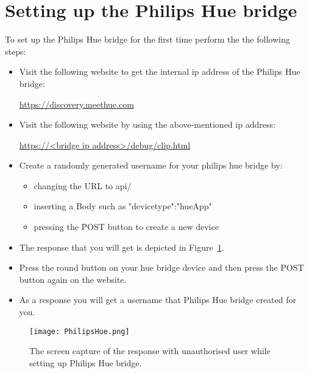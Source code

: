 \section{Setting up the Philips Hue bridge}
\label{sec:setting-up-the-philips-hue-bridge.}
To set up the Philips Hue bridge for the first time perform the the following steps:
\begin{itemize}
    \item Visit the following website to get the internal ip address of the Philips Hue bridge:

    \url{https://discovery.meethue.com}
    \item Visit the following website by using the above-mentioned ip address:

    \url{https://<bridge ip address>/debug/clip.html}
    \item Create a randomly generated username for your philips hue bridge by:
    \begin{itemize}
        \item changing the URL to api/
        \item inserting a Body such as {"devicetype":"hueApp"}
        \item pressing the POST button to create a new device
    \end{itemize}
    \item The response that you will get is depicted in Figure~\ref{fig:PhilipsHue}.
    \item Press the round button on your hue bridge device and then press the POST button again on the website.
    \item As a response you will get a username that Philips Hue bridge created for you.
\end{itemize}

\begin{figure}[hbt!]
    \centering
    \texttt{[image: PhilipsHue.png]}
    \caption{The screen capture of the response with unauthorised user while setting up Philips Hue bridge.}
    \label{fig:PhilipsHue}
\end{figure}
